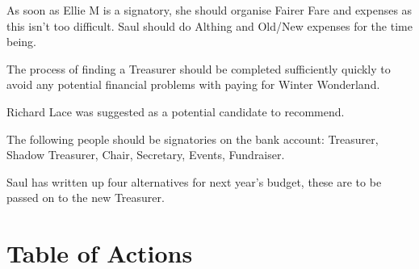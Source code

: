 \documentclass[a4paper, 12pt]{article}
\begin{document}
As soon as Ellie M is a signatory, she should organise Fairer Fare and expenses as this isn't too difficult. Saul should do Althing and Old/New expenses for the time being.

The process of finding a Treasurer should be completed sufficiently quickly to avoid any potential financial problems with paying for Winter Wonderland.

Richard Lace was suggested as a potential candidate to recommend.

The following people should be signatories on the bank account: Treasurer, Shadow Treasurer, Chair, Secretary, Events, Fundraiser.

Saul has written up four alternatives for next year's budget, these are to be passed on to the new Treasurer.

\section{Table of Actions}
\end{document}
